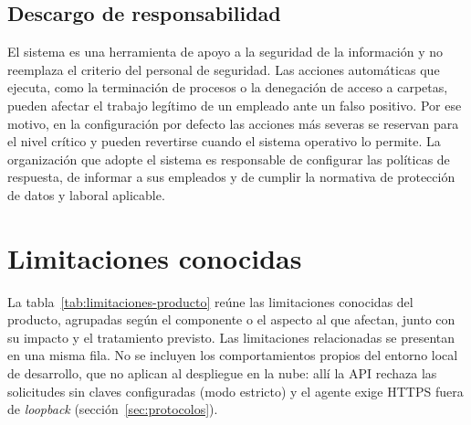 \subsection{Descargo de responsabilidad}
El sistema es una herramienta de apoyo a la seguridad de la información y no reemplaza el criterio del personal de seguridad. Las acciones automáticas que ejecuta, como la terminación de procesos o la denegación de acceso a carpetas, pueden afectar el trabajo legítimo de un empleado ante un falso positivo. Por ese motivo, en la configuración por defecto las acciones más severas se reservan para el nivel crítico y pueden revertirse cuando el sistema operativo lo permite. La organización que adopte el sistema es responsable de configurar las políticas de respuesta, de informar a sus empleados y de cumplir la normativa de protección de datos y laboral aplicable.

\section{Limitaciones conocidas}
\label{sec:limitaciones-producto}
\label{sec:sintesis-limitaciones}
La tabla~\ref{tab:limitaciones-producto} reúne las limitaciones conocidas del producto, agrupadas según el componente o el aspecto al que afectan, junto con su impacto y el tratamiento previsto. Las limitaciones relacionadas se presentan en una misma fila. No se incluyen los comportamientos propios del entorno local de desarrollo, que no aplican al despliegue en la nube: allí la API rechaza las solicitudes sin claves configuradas (modo estricto) y el agente exige HTTPS fuera de \emph{loopback} (sección~\ref{sec:protocolos}).

